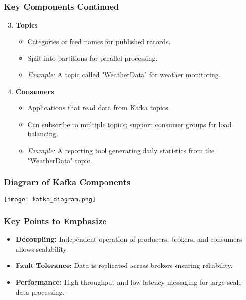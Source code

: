 \documentclass[aspectratio=169]{beamer}
\begin{document}
\begin{frame}[fragile]
    \frametitle{Key Components Continued}
    \begin{enumerate}
        \setcounter{enumi}{2}
        \item \textbf{Topics}
            \begin{itemize}
                \item Categories or feed names for published records.
                \item Split into partitions for parallel processing.
                \item \textit{Example:} A topic called "WeatherData" for weather monitoring.
            \end{itemize}

        \item \textbf{Consumers}
            \begin{itemize}
                \item Applications that read data from Kafka topics.
                \item Can subscribe to multiple topics; support consumer groups for load balancing.
                \item \textit{Example:} A reporting tool generating daily statistics from the "WeatherData" topic.
            \end{itemize}
    \end{enumerate}
\end{frame}

\begin{frame}[fragile]
    \frametitle{Diagram of Kafka Components}
    \begin{center}
        \texttt{[image: kafka\_diagram.png]} %
    \end{center}
\end{frame}

\begin{frame}[fragile]
    \frametitle{Key Points to Emphasize}
    \begin{itemize}
        \item \textbf{Decoupling:} Independent operation of producers, brokers, and consumers allows scalability.
        \item \textbf{Fault Tolerance:} Data is replicated across brokers ensuring reliability.
        \item \textbf{Performance:} High throughput and low-latency messaging for large-scale data processing.
    \end{itemize}
\end{frame}
\end{document}

